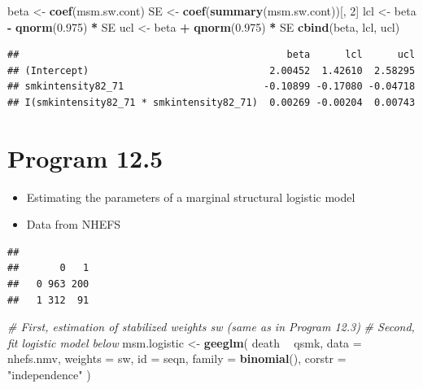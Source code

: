 \documentclass[
  10pt,
]{book}
\newenvironment{Shaded}{\begin{snugshade}}{\end{snugshade}}
\newcommand{\CommentTok}[1]{\textcolor[rgb]{0.56,0.35,0.01}{\textit{#1}}}
\newcommand{\DataTypeTok}[1]{\textcolor[rgb]{0.13,0.29,0.53}{#1}}
\newcommand{\DecValTok}[1]{\textcolor[rgb]{0.00,0.00,0.81}{#1}}
\newcommand{\FloatTok}[1]{\textcolor[rgb]{0.00,0.00,0.81}{#1}}
\newcommand{\KeywordTok}[1]{\textcolor[rgb]{0.13,0.29,0.53}{\textbf{#1}}}
\newcommand{\NormalTok}[1]{#1}
\newcommand{\OperatorTok}[1]{\textcolor[rgb]{0.81,0.36,0.00}{\textbf{#1}}}
\newcommand{\StringTok}[1]{\textcolor[rgb]{0.31,0.60,0.02}{#1}}
\providecommand{\tightlist}{%
  \setlength{\itemsep}{0pt}\setlength{\parskip}{0pt}}
\begin{document}
\begin{Shaded}
\begin{Highlighting}[]
\NormalTok{beta <-}\StringTok{ }\KeywordTok{coef}\NormalTok{(msm.sw.cont)}
\NormalTok{SE <-}\StringTok{ }\KeywordTok{coef}\NormalTok{(}\KeywordTok{summary}\NormalTok{(msm.sw.cont))[, }\DecValTok{2}\NormalTok{]}
\NormalTok{lcl <-}\StringTok{ }\NormalTok{beta }\OperatorTok{-}\StringTok{ }\KeywordTok{qnorm}\NormalTok{(}\FloatTok{0.975}\NormalTok{) }\OperatorTok{*}\StringTok{ }\NormalTok{SE}
\NormalTok{ucl <-}\StringTok{ }\NormalTok{beta }\OperatorTok{+}\StringTok{ }\KeywordTok{qnorm}\NormalTok{(}\FloatTok{0.975}\NormalTok{) }\OperatorTok{*}\StringTok{ }\NormalTok{SE}
\KeywordTok{cbind}\NormalTok{(beta, lcl, ucl)}
\end{Highlighting}
\end{Shaded}

\begin{verbatim}
##                                              beta      lcl      ucl
## (Intercept)                               2.00452  1.42610  2.58295
## smkintensity82_71                        -0.10899 -0.17080 -0.04718
## I(smkintensity82_71 * smkintensity82_71)  0.00269 -0.00204  0.00743
\end{verbatim}

\hypertarget{program-12.5}{%
\section{Program 12.5}\label{program-12.5}}

\begin{itemize}
\tightlist
\item
  Estimating the parameters of a marginal structural logistic model
\item
  Data from NHEFS
\end{itemize}

\begin{Shaded}
\end{Shaded}

\begin{verbatim}
##    
##       0   1
##   0 963 200
##   1 312  91
\end{verbatim}

\begin{Shaded}
\begin{Highlighting}[]
\CommentTok{# First, estimation of stabilized weights sw (same as in Program 12.3)}
\CommentTok{# Second, fit logistic model below}
\NormalTok{msm.logistic <-}\StringTok{ }\KeywordTok{geeglm}\NormalTok{(}
\NormalTok{  death }\OperatorTok{~}\StringTok{ }\NormalTok{qsmk,}
  \DataTypeTok{data =}\NormalTok{ nhefs.nmv,}
  \DataTypeTok{weights =}\NormalTok{ sw,}
  \DataTypeTok{id =}\NormalTok{ seqn,}
  \DataTypeTok{family =} \KeywordTok{binomial}\NormalTok{(),}
  \DataTypeTok{corstr =} \StringTok{"independence"}
\NormalTok{)}
\end{Highlighting}
\end{Shaded}
\end{document}
